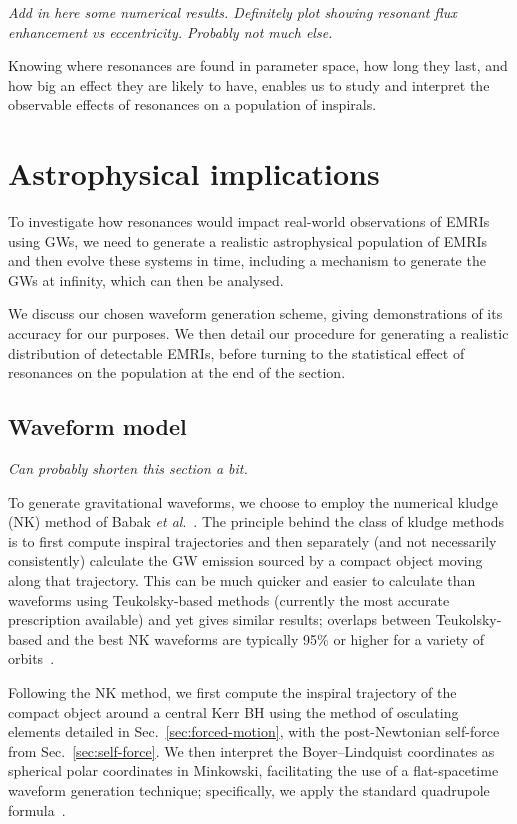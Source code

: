 \documentclass[aps,prd,amsfonts,amssymb,amsmath,nofootinbib,showpacs,superscriptaddress,twocolumn]{revtex4}
\newcommand{\secref}[1]{Sec.\ \ref{sec:#1}}
\begin{document}
\emph{Add in here some numerical results. Definitely plot showing resonant flux enhancement vs eccentricity. Probably not much else.}

Knowing where resonances are found in parameter space, how long they last, and how big an effect they are likely to have, enables us to study and interpret the observable effects of resonances on a population of inspirals.


\section{Astrophysical implications}
\label{sec:astrophysics}

To investigate how resonances would impact real-world observations of EMRIs using GWs, we need to generate a realistic astrophysical population of EMRIs and then evolve these systems in time, including a mechanism to generate the GWs at infinity, which can then be analysed.

We discuss our chosen waveform generation scheme, giving demonstrations of its accuracy for our purposes. We then detail our procedure for generating a realistic distribution of detectable EMRIs, before turning to the statistical effect of resonances on the population at the end of the section.

\subsection{Waveform model}
\emph{Can probably shorten this section a bit.}

To generate gravitational waveforms, we choose to employ the numerical kludge (NK) method of Babak {\it{et al}}.~\cite{Babak2007}. The principle behind the class of kludge methods is to first compute inspiral trajectories and then separately (and not necessarily consistently) calculate the GW emission sourced by a compact object moving along that trajectory. This can be much quicker and easier to calculate than waveforms using Teukolsky-based methods (currently the most accurate prescription available) and yet gives similar results; overlaps between Teukolsky-based and the best NK waveforms are typically 95\% or higher for a variety of orbits~\cite{Babak2007, Berry2013}.

Following the NK method, we first compute the inspiral trajectory of the compact object around a central Kerr BH using the method of osculating elements detailed in \secref{forced-motion}, with the post-Newtonian self-force from \secref{self-force}. We then interpret the Boyer--Lindquist coordinates as spherical polar coordinates in Minkowski, facilitating the use of a flat-spacetime waveform generation technique; specifically, we apply the standard quadrupole formula~\cite{Misner1973}.
\end{document}
